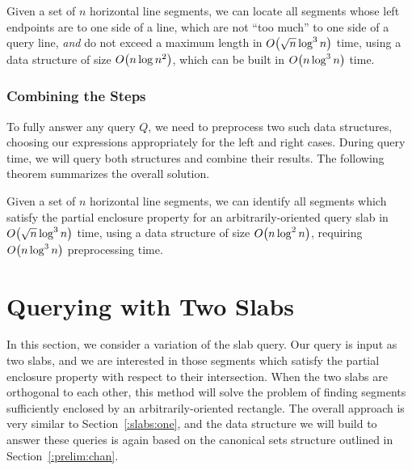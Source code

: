 \begin{lemma}
\label{lem:slabs:one:step3}
Given a set of $n$ horizontal line segments, we can locate all segments whose left endpoints are to one side of a line, which are not ``too much'' to one side of a query line, \emph{and} do not exceed a maximum length in $O\!\left(\sqrt{n}\log^3{n}\right)$ time, using a data structure of size $O\!\left(n\log{n}^2\right)$, which can be built in $O\!\left(n\log^3{n}\right)$ time.
\end{lemma}

\subsubsection{Combining the Steps}

To fully answer any query $Q$, we need to preprocess two such data structures, choosing our expressions appropriately for the left and right cases.
During query time, we will query both structures and combine their results.
The following theorem summarizes the overall solution.

\begin{theorem}
\label{th:slabs:one}
Given a set of $n$ horizontal line segments, we can identify all segments which satisfy the partial enclosure property for an arbitrarily-oriented query slab in $O\!\left(\sqrt{n}\log^3{n}\right)$ time, using a data structure of size $O\!\left(n\log^2{n}\right)$, requiring $O\!\left(n\log^3{n}\right)$ preprocessing time.
\end{theorem}


\section{Querying with Two Slabs}
\label{:slabs:two}

In this section, we consider a variation of the slab query. 
Our query is input as two slabs, and we are interested in those segments which satisfy the partial enclosure property with respect to their intersection.
When the two slabs are orthogonal to each other, this method will solve the problem of finding segments sufficiently enclosed by an arbitrarily-oriented rectangle.  
The overall approach is very similar to Section~\ref{:slabs:one}, and the data structure we will build to answer these queries is again based on the canonical sets structure outlined in Section~\ref{:prelim:chan}.


